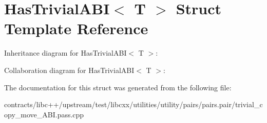 \hypertarget{struct_has_trivial_a_b_i}{}\section{Has\+Trivial\+A\+BI$<$ T $>$ Struct Template Reference}
\label{struct_has_trivial_a_b_i}


Inheritance diagram for Has\+Trivial\+A\+BI$<$ T $>$\+:


Collaboration diagram for Has\+Trivial\+A\+BI$<$ T $>$\+:


The documentation for this struct was generated from the following file\+:\begin{DoxyCompactItemize}
\item 
contracts/libc++/upstream/test/libcxx/utilities/utility/pairs/pairs.\+pair/trivial\+\_\+copy\+\_\+move\+\_\+\+A\+B\+I.\+pass.\+cpp\end{DoxyCompactItemize}
